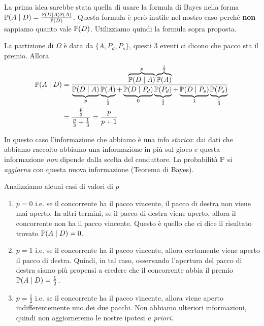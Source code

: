 \begin{enumerate}
\begin{oss}
La prima idea sarebbe stata quella di usare la formula di Bayes nella forma $\mathbb{P}( A\mid D) =\frac{\mathbb{P}( D\mid A)\mathbb{P}( A)}{\mathbb{P}( D)}$. Questa formula è però inutile nel nostro caso perché \textbf{non} sappiamo quanto vale $\mathbb{P}( D)$. Utilizziamo quindi la formula sopra proposta.
\end{oss}

La partizione di $\Omega $ è data da $\{A,P_{d} ,P_{s}\}$, questi $3$ eventi ci dicono che pacco sta il premio. Allora
\begin{align*}
\mathbb{P}( A\mid D) & =\frac{\overbrace{\mathbb{P}( D\mid A)}^{p}\overbrace{\mathbb{P}( A)}^{\frac{1}{3}}}{\underbrace{\mathbb{P}( D\mid A)}_{p}\underbrace{\mathbb{P}( A)}_{\frac{1}{3}} +\underbrace{\mathbb{P}( D\mid P_{d})}_{0}\underbrace{\mathbb{P}( P_{d})}_{\frac{1}{3}} +\underbrace{\mathbb{P}( D\mid P_{s})}_{1}\underbrace{\mathbb{P}( P_{s})}_{\frac{1}{3}}}\\
 & =\frac{\frac{p}{3}}{\frac{p}{3} +\frac{1}{3}} =\frac{p}{p+1}
\end{align*}

\begin{oss}
In questo caso l'informazione che abbiamo è una info \textit{storica}: dai dati che abbiamo raccolto abbiamo una informazione in più sul gioco e questa informazione \textit{non} dipende dalla scelta del conduttore. La probabilità $\mathbb{P}$ si \textit{aggiorna} con questa nuova informazione (Teorema di Bayes).
\end{oss}

Analizziamo alcuni casi di valori di $p$
\begin{enumerate}
\item $\boxed{p=0}$ i.e. se il concorrente ha il pacco vincente, il pacco di destra non viene mai aperto. In altri termini, se il pacco di destra viene aperto, allora il concorrente non ha il pacco vincente. Questo è quello che ci dice il risultato trovato $\mathbb{P}( A\mid D) =0$.
\item $\boxed{p=1}$ i.e. se il concorrente ha il pacco vincente, allora certamente viene aperto il pacco di destra. Quindi, in tal caso, osservando l'apertura del pacco di destra siamo più propensi a credere che il concorrente abbia il premio $\mathbb{P}( A\mid D) =\frac{1}{2}$.
\item $\boxed{p=\frac{1}{2}}$ i.e. se il concorrente ha il pacco vincente, allora viene aperto indifferentemente uno dei due pacchi. Non abbiamo ulteriori informazioni, quindi non aggiorneremo le nostre ipotesi \textit{a priori}.
\end{enumerate}
\end{enumerate}
\Soluzione
\Soluzione
\Soluzione

